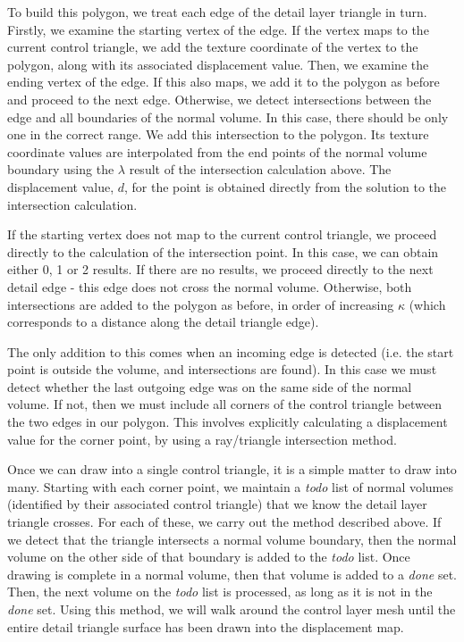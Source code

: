 To build this polygon, we treat each edge of the detail layer triangle in turn. Firstly, we examine the starting vertex of the edge. If the vertex maps to the current control triangle, we add the texture coordinate of the vertex to the polygon, along with its associated displacement value. Then, we examine the ending vertex of the edge. If this also maps, we add it to the polygon as before and proceed to the next edge. Otherwise, we detect intersections between the edge and all boundaries of the normal volume. In this case, there should be only one in the correct range. We add this intersection to the polygon. Its texture coordinate values are interpolated from the end points of the normal volume boundary using the $\lambda$ result of the intersection calculation above. The displacement value, $d$, for the point is obtained directly from the solution to the intersection calculation.

If the starting vertex does not map to the current control triangle, we proceed directly to the calculation of the intersection point. In this case, we can obtain either 0, 1 or 2 results. If there are no results, we proceed directly to the next detail edge - this edge does not cross the normal volume. Otherwise, both intersections are added to the polygon as before, in order of increasing $\kappa$ (which corresponds to a distance along the detail triangle edge).

The only addition to this comes when an incoming edge is detected (i.e. the start point is outside the volume, and intersections are found). In this case we must detect whether the last outgoing edge was on the same side of the normal volume. If not, then we must include all corners of the control triangle between the two edges in our polygon. This involves explicitly calculating a displacement value for the corner point, by using a ray/triangle intersection method.

Once we can draw into a single control triangle, it is a simple matter to draw into many. Starting with each corner point, we maintain a {\it todo} list of normal volumes (identified by their associated control triangle) that we know the detail layer triangle crosses. For each of these, we carry out the method described above. If we detect that the triangle intersects a normal volume boundary, then the normal volume on the other side of that boundary is added to the {\it todo} list. Once drawing is complete in a normal volume, then that volume is added to a {\it done} set. Then, the next volume on the {\it todo} list is processed, as long as it is not in the {\it done} set. Using this method, we will walk around the control layer mesh until the entire detail triangle surface has been drawn into the displacement map.

